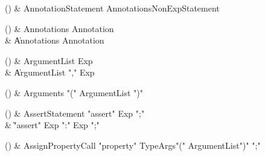 \begin{bbgrammarappendix}

() & AnnotationStatement \label{prod:AnnotationStatement}  \: Annotations\opt NonExpStatement  \\


\end{bbgrammarappendix}

\begin{bbgrammarappendix}

() & Annotations \label{prod:Annotations}  \: Annotation  \\

 &    \| Annotations Annotation \\

\end{bbgrammarappendix}

\begin{bbgrammarappendix}

() & ArgumentList \label{prod:ArgumentList}  \: Exp  \\

 &    \| ArgumentList \xcd"," Exp \\

\end{bbgrammarappendix}

\begin{bbgrammarappendix}

() & Arguments \label{prod:Arguments}  \: \xcd"(" ArgumentList \xcd")"  \\


\end{bbgrammarappendix}

\begin{bbgrammarappendix}

() & AssertStatement \label{prod:AssertStatement}  \: \xcd"assert" Exp \xcd";"  \\

 &    \| \xcd"assert" Exp  \xcd":" Exp  \xcd";" \\

\end{bbgrammarappendix}

\begin{bbgrammarappendix}

() & AssignPropertyCall \label{prod:AssignPropertyCall}  \: \xcd"property" TypeArgs\opt \xcd"(" ArgumentList\opt \xcd")" \xcd";"  \\


\end{bbgrammarappendix}

